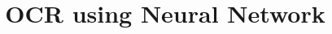 \documentclass[12pt,a4paper]{report}
\title{OCR using Neural Network}
\begin{document}
\renewcommand\bibname{References} %







\tableofcontents
\listoffigures

\newpage
{}






 
\end{document}

